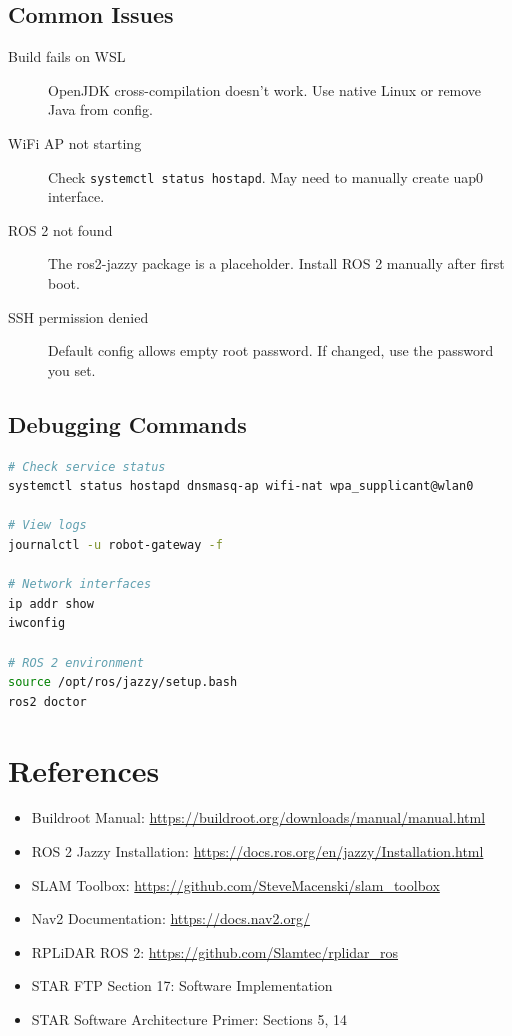 \documentclass[11pt,letterpaper]{article}
\begin{document}
\subsection{Common Issues}

\begin{description}
    \item[Build fails on WSL] OpenJDK cross-compilation doesn't work. Use native Linux or remove Java from config.

    \item[WiFi AP not starting] Check \texttt{systemctl status hostapd}. May need to manually create uap0 interface.

    \item[ROS 2 not found] The ros2-jazzy package is a placeholder. Install ROS 2 manually after first boot.

    \item[SSH permission denied] Default config allows empty root password. If changed, use the password you set.
\end{description}

\subsection{Debugging Commands}

\begin{lstlisting}[language=bash]
# Check service status
systemctl status hostapd dnsmasq-ap wifi-nat wpa_supplicant@wlan0

# View logs
journalctl -u robot-gateway -f

# Network interfaces
ip addr show
iwconfig

# ROS 2 environment
source /opt/ros/jazzy/setup.bash
ros2 doctor
\end{lstlisting}

\section{References}

\begin{itemize}
    \item Buildroot Manual: \url{https://buildroot.org/downloads/manual/manual.html}
    \item ROS 2 Jazzy Installation: \url{https://docs.ros.org/en/jazzy/Installation.html}
    \item SLAM Toolbox: \url{https://github.com/SteveMacenski/slam_toolbox}
    \item Nav2 Documentation: \url{https://docs.nav2.org/}
    \item RPLiDAR ROS 2: \url{https://github.com/Slamtec/rplidar_ros}
    \item STAR FTP Section 17: Software Implementation
    \item STAR Software Architecture Primer: Sections 5, 14
\end{itemize}
\end{document}
